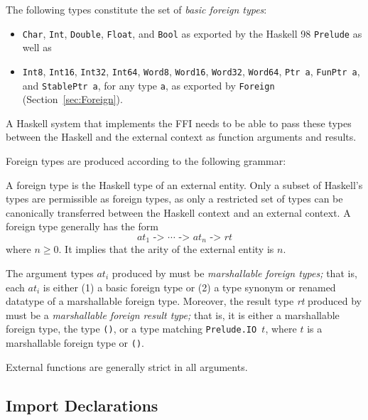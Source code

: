 \documentclass[a4paper,twoside]{article}
\newcommand{\code}[1]{\texttt{#1}}      %
\begin{document}
The following types constitute the set of \emph{basic foreign types}:
%
\begin{itemize}
\item \code{Char}, \code{Int}, \code{Double}, \code{Float}, and \code{Bool} as
  exported by the Haskell 98 \code{Prelude} as well as
\item \code{Int8}, \code{Int16}, \code{Int32}, \code{Int64}, \code{Word8},
  \code{Word16}, \code{Word32}, \code{Word64}, \code{Ptr a}, \code{FunPtr a},
  and \code{StablePtr a}, for any type \code{a}, as exported by \code{Foreign}
  (Section~\ref{sec:Foreign}).
\end{itemize}
%
A Haskell system that implements the FFI needs to be able to pass these types
between the Haskell and the external context as function arguments and
results.

Foreign types are produced according to the following grammar:
%
\begin{grammar}
  \gor{%
    ()}
\end{grammar}
%
A foreign type is the Haskell type of an external entity.  Only a subset of
Haskell's types are permissible as foreign types, as only a restricted set of
types can be canonically transferred between the Haskell context and an
external context.  A foreign type generally has the form
\[
\textit{at}_1\code{ -> }\cdots\code{ -> }\textit{at}_n\code{ -> }\textit{rt}
\]
where \(n\geq0\).  It implies that the arity of the external entity is $n$.

The argument types \(\textit{at}_i\) produced by  must be
\emph{marshallable foreign types;} that is, each \(\textit{at}_i\) is either
(1) a basic foreign type or (2) a type synonym or renamed datatype of a
marshallable foreign type.  Moreover, the result type \textit{rt} produced by
 must be a \emph{marshallable foreign result type;} that is, it
is either a marshallable foreign type, the type \code{()}, or a type matching
\code{Prelude.IO }$t$, where $t$ is a marshallable foreign type or \code{()}.

External functions are generally strict in all arguments.

\subsection{Import Declarations}
\label{sec:import}
\end{document}
